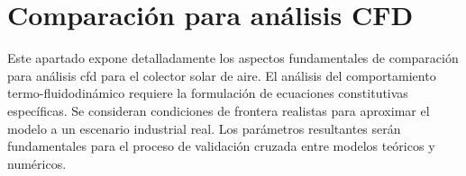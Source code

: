 \section{Comparación para análisis CFD}
\label{sec:cap08_analisis}

Este apartado expone detalladamente los aspectos fundamentales de comparación para análisis cfd para el colector solar de aire.
El análisis del comportamiento termo-fluidodinámico requiere la formulación de ecuaciones constitutivas específicas.
Se consideran condiciones de frontera realistas para aproximar el modelo a un escenario industrial real.
Los parámetros resultantes serán fundamentales para el proceso de validación cruzada entre modelos teóricos y numéricos.
